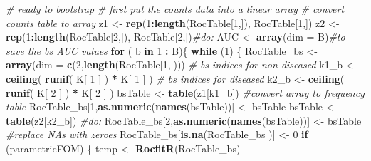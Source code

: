 \documentclass[
]{book}
\newenvironment{Shaded}{\begin{snugshade}}{\end{snugshade}}
\newcommand{\CommentTok}[1]{\textcolor[rgb]{0.56,0.35,0.01}{\textit{#1}}}
\newcommand{\ControlFlowTok}[1]{\textcolor[rgb]{0.13,0.29,0.53}{\textbf{#1}}}
\newcommand{\DataTypeTok}[1]{\textcolor[rgb]{0.13,0.29,0.53}{#1}}
\newcommand{\DecValTok}[1]{\textcolor[rgb]{0.00,0.00,0.81}{#1}}
\newcommand{\KeywordTok}[1]{\textcolor[rgb]{0.13,0.29,0.53}{\textbf{#1}}}
\newcommand{\NormalTok}[1]{#1}
\newcommand{\OperatorTok}[1]{\textcolor[rgb]{0.81,0.36,0.00}{\textbf{#1}}}
\newcommand{\StringTok}[1]{\textcolor[rgb]{0.31,0.60,0.02}{#1}}
\begin{document}
\begin{Shaded}
\begin{Highlighting}[]
  \CommentTok{# ready to bootstrap}
  \CommentTok{# first put the counts data into a linear array}
  \CommentTok{# convert counts table to array}
\NormalTok{  z1  <-}\StringTok{ }\KeywordTok{rep}\NormalTok{(}\DecValTok{1}\OperatorTok{:}\KeywordTok{length}\NormalTok{(RocTable[}\DecValTok{1}\NormalTok{,]),}
\NormalTok{             RocTable[}\DecValTok{1}\NormalTok{,])}
\NormalTok{  z2  <-}\StringTok{ }\KeywordTok{rep}\NormalTok{(}\DecValTok{1}\OperatorTok{:}\KeywordTok{length}\NormalTok{(RocTable[}\DecValTok{2}\NormalTok{,]),}
\NormalTok{             RocTable[}\DecValTok{2}\NormalTok{,])}\CommentTok{#do:}
\NormalTok{  AUC <-}\StringTok{ }\KeywordTok{array}\NormalTok{(}\DataTypeTok{dim =}\NormalTok{ B)}\CommentTok{#to save the bs AUC values}
  \ControlFlowTok{for}\NormalTok{ ( b }\ControlFlowTok{in} \DecValTok{1} \OperatorTok{:}\StringTok{ }\NormalTok{B)\{}
    \ControlFlowTok{while}\NormalTok{ (}\DecValTok{1}\NormalTok{) \{}
\NormalTok{      RocTable_bs  <-}\StringTok{ }
\StringTok{        }\KeywordTok{array}\NormalTok{(}\DataTypeTok{dim =} \KeywordTok{c}\NormalTok{(}\DecValTok{2}\NormalTok{,}\KeywordTok{length}\NormalTok{(RocTable[}\DecValTok{1}\NormalTok{,])))}
      \CommentTok{# bs indices for non-diseased    }
\NormalTok{      k1_b <-}\StringTok{ }\KeywordTok{ceiling}\NormalTok{( }\KeywordTok{runif}\NormalTok{( K[ }\DecValTok{1}\NormalTok{ ] ) }\OperatorTok{*}\StringTok{ }\NormalTok{K[ }\DecValTok{1}\NormalTok{ ] )}
      \CommentTok{# bs indices for diseased}
\NormalTok{      k2_b <-}\StringTok{ }\KeywordTok{ceiling}\NormalTok{( }\KeywordTok{runif}\NormalTok{( K[ }\DecValTok{2}\NormalTok{ ] ) }\OperatorTok{*}\StringTok{ }\NormalTok{K[ }\DecValTok{2}\NormalTok{ ] )}
\NormalTok{      bsTable <-}\StringTok{ }\KeywordTok{table}\NormalTok{(z1[k1_b])}
      \CommentTok{#convert array to frequency table}
\NormalTok{      RocTable_bs[}\DecValTok{1}\NormalTok{,}\KeywordTok{as.numeric}\NormalTok{(}\KeywordTok{names}\NormalTok{(bsTable))] <-}\StringTok{ }
\StringTok{        }\NormalTok{bsTable}
\NormalTok{      bsTable <-}\StringTok{ }\KeywordTok{table}\NormalTok{(z2[k2_b])}
      \CommentTok{#do:}
\NormalTok{      RocTable_bs[}\DecValTok{2}\NormalTok{,}\KeywordTok{as.numeric}\NormalTok{(}\KeywordTok{names}\NormalTok{(bsTable))] <-}\StringTok{ }
\StringTok{        }\NormalTok{bsTable}
      \CommentTok{#replace NAs with zeroes}
\NormalTok{      RocTable_bs[}\KeywordTok{is.na}\NormalTok{(RocTable_bs )] <-}\StringTok{ }\DecValTok{0}
      \ControlFlowTok{if}\NormalTok{ (parametricFOM) \{}
\NormalTok{        temp <-}\StringTok{ }\KeywordTok{RocfitR}\NormalTok{(RocTable_bs)}

\end{Highlighting}
\end{Shaded}
\end{document}

